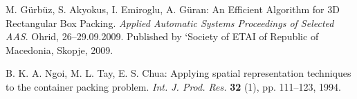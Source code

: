 \documentclass[12pt]{article}
\begin{document}
\begin{thebibliography}{99}

 M. G\"{u}rb\"{u}z, S. Akyokus, I. Emiroglu, A. G\"{u}ran: An Efficient Algorithm for 3D Rectangular Box Packing. \emph{Applied Automatic Systems Proceedings of Selected AAS}. Ohrid, 26--29.09.2009. Published by `Society of ETAI of Republic of Macedonia, Skopje, 2009. 

 B. K. A. Ngoi, M. L. Tay, E. S. Chua: Applying spatial representation techniques to the container packing problem. \emph{Int. J. Prod. Res.} \textbf{32} (1), pp. 111--123, 1994. 

\end{thebibliography}
\end{document}
